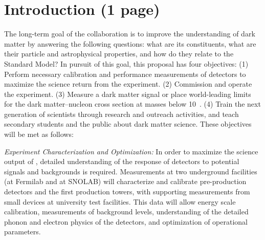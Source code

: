 
\section{Introduction (1 page)}\label{sec:overview}
The long-term goal of the \scs collaboration is to improve the understanding of dark matter by answering the following questions: what are its constituents, what are their particle and astrophysical properties, and how do they relate to the Standard Model? In pursuit of this goal, this proposal has four objectives:  
(1) Perform necessary calibration and performance measurements of \scs detectors to maximize the science return from the experiment.
(2) Commission and operate the \scs experiment.
(3) Measure a dark matter signal or place world-leading limits for the dark matter--nucleon cross section at masses below 10~\gev.
(4) Train the next generation of scientists through research and outreach activities, and teach secondary students and the public about dark matter science. 
These objectives will be met as follows:

 

{\it Experiment Characterization and Optimization:} In order to maximize the science output of \scs, detailed understanding of the response of detectors to potential signals and backgrounds is required. Measurements at two underground facilities (\nexus at Fermilab and \cute at SNOLAB) will characterize and calibrate pre-production \scs detectors and the first production \scs towers, with supporting measurements from small devices at university test facilities. This data will allow energy scale calibration, measurements of background levels, understanding of the detailed phonon and electron physics of the detectors, and optimization of \scs operational parameters. 

